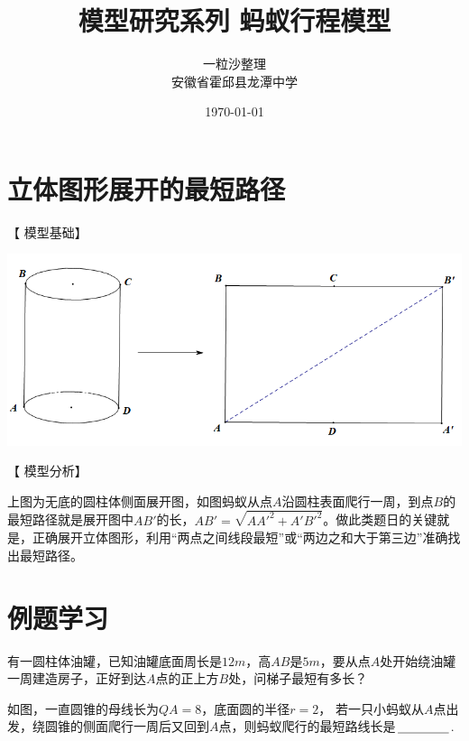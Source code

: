 \documentclass[10pt]{ctexart}
\title{模型研究系列 \quad 蚂蚁行程模型}
\author{一粒沙整理\\安徽省霍邱县龙潭中学}
\date{\today}
\begin{document}
\maketitle
\tableofcontents



\section{立体图形展开的最短路径}
【 {\heiti 模型基础}】

\begin{center}
	\includegraphics[scale=0.6]{figure/mayixingcheng01}
\end{center}

【 {\heiti 模型分析}】

上图为无底的圆柱体侧面展开图，如图蚂蚁从点$A$沿圆柱表面爬行一周，到点$B$的最短路径就是展开图中$AB'$的长，$AB'=\sqrt{AA'^2+A'B'^2}$。做此类题日的关键就是，正确展开立体图形，利用“两点之间线段最短”或“两边之和大于第三边”准确找出最短路径。

\section{例题学习}

\begin{shaded}
	\begin{example}
	有一圆柱体油罐，已知油罐底面周长是$12m$，高$AB$是$5m$，要从点$A$处开始绕油罐一周建造房子，正好到达$A$点的正上方$B$处，问梯子最短有多长？
	\end{example}
\end{shaded}

\begin{shaded}
	\begin{example}
	如图，一直圆锥的母线长为$QA=8$，底面圆的半径$r=2$， 若一只小蚂蚁从$A$点出发，绕圆锥的侧面爬行一周后又回到$A$点，则蚂蚁爬行的最短路线长是$\underline{\hspace{1.5cm}}$.
	\end{example}
\end{shaded}
\end{document}
